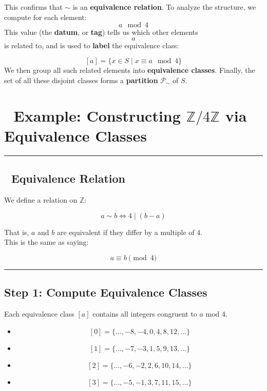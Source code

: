 \documentclass[
]{article}
\providecommand{\tightlist}{%
  \setlength{\itemsep}{0pt}\setlength{\parskip}{0pt}}
\begin{document}
This confirms that \(\sim\) is an \textbf{equivalence relation}. To
analyze the structure, we compute for each element: \[
a \mod 4
\] This value (the \textbf{datum}, or \textbf{tag}) tells us which other
elements \[a\]is related to, and is used to \textbf{label} the
equivalence class:

\[
[a] = \{ x \in S \mid x \equiv a \mod 4 \}
\] We then group all such related elements into \textbf{equivalence
classes}. Finally, the set of all these disjoint classes forms a
\textbf{partition} \(\mathcal{P}_\sim\) of \(S\).

\section{\texorpdfstring{🧮 Example: Constructing
\(\mathbb{Z}/4\mathbb{Z}\) via Equivalence
Classes}{🧮 Example: Constructing \textbackslash mathbb\{Z\}/4\textbackslash mathbb\{Z\} via Equivalence Classes}}\label{example-constructing-mathbbz4mathbbz-via-equivalence-classes}

\begin{center}\rule{0.5\linewidth}{0.5pt}\end{center}

\subsection{🔧 Equivalence Relation}\label{equivalence-relation}

We define a relation on \(\mathbb{Z}\):

\[
a \sim b \iff 4 \mid (b - a)
\]

That is, \(a\) and \(b\) are equivalent if they differ by a multiple of
4.\\
This is the same as saying:

\[
a \equiv b \pmod{4}
\]

\begin{center}\rule{0.5\linewidth}{0.5pt}\end{center}

\subsection{Step 1: Compute Equivalence
Classes}\label{step-1-compute-equivalence-classes}

Each equivalence class \([a]\) contains all integers congruent to \(a\)
mod 4.

\begin{itemize}
\tightlist
\item
  \[ [0] = \{ ..., -8, -4, 0, 4, 8, 12, ... \} \]
\item
  \[ [1] = \{ ..., -7, -3, 1, 5, 9, 13, ... \} \]
\item
  \[ [2] = \{ ..., -6, -2, 2, 6, 10, 14, ... \} \]
\item
  \[ [3] = \{ ..., -5, -1, 3, 7, 11, 15, ... \} \]
\end{itemize}
\end{document}
